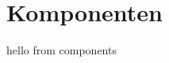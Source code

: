 \documentclass[.../Dokumentation.tex]{subfiles}
\begin{document}
    \section{Komponenten}\label{sec-components}
    hello from components
\end{document}
